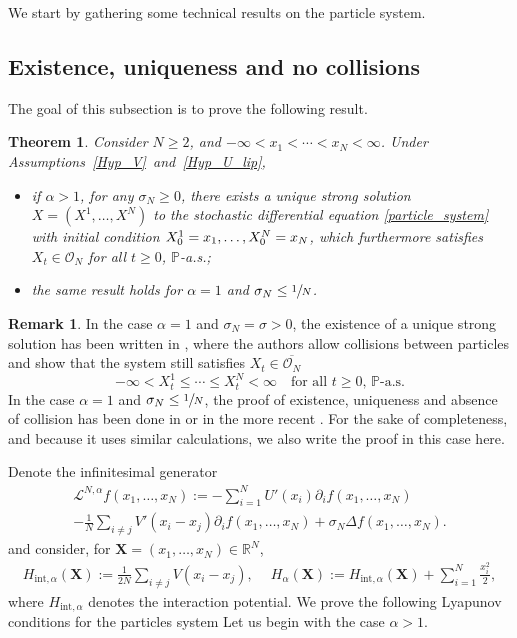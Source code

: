 \documentclass[10pt]{amsart}
\newcommand{\bX}{{\boldsymbol{X}}}
\newcommand{\rint}{\mathrm{int}}
\theoremstyle{plain}
\newtheorem{theorem}{Theorem}
\theoremstyle{definition}
\newtheorem{remark}{Remark}[section]
\begin{document}
We start by gathering some technical results on the particle system.

\subsection{Existence, uniqueness and no collisions}\label{sec_exist}

The goal of this subsection is to prove the following result.

\begin{theorem}\label{exist_unique}
Consider $N\geq 2$, and $-\infty<x_1<\cdots<x_N<\infty$. Under Assumptions~\ref{Hyp_V}~and~\ref{Hyp_U_lip},
\begin{itemize}
\item if $\alpha>1$, for any $\sigma_N\geq0$, there exists a unique strong solution $X=(X^1,\dots,X^N)$ to the stochastic differential equation \eqref{particle_system} with initial condition $X^1_0=x_1,\dots,\allowbreak X^N_0=\nobreak x_N$, which furthermore satisfies $X_t\in\mathcal{O}_N$ for all $t\geq0$, $\mathbb{P}$-a.s.;
\item the same result holds for $\alpha=1$ and $\sigma_N\leq\sfrac{1}{N}$.
\end{itemize}
\end{theorem}

\begin{remark}
In the case $\alpha=1$ and $\sigma_N=\sigma>0$, the existence of a unique strong solution has been written in \cite[Th.\,2.5]{cepa_lepingle}, where the authors allow collisions between particles and show that the system still satisfies $X_t\in\overline{\mathcal{O}_N}$ \ie
\[
-\infty<X^1_t\leq\cdots\leq X^N_t<\infty\quad\text{for all }t\geq0,\, \mathbb{P}\text{-a.s.}
\]
In the case $\alpha=1$ and $\sigma_N\leq\sfrac{1}{N}$, the proof of existence, uniqueness and absence of collision has been done in \cite{Rogers_Shi} or in the more recent \cite{Li_Li_Xie}. For the sake of completeness, and because it uses similar calculations, we also write the proof in this case here.
\end{remark}

Denote the infinitesimal generator
\begin{multline*}
\mathcal{L}^{N,\alpha}f(x_1,\dots,x_N):=-\sum_{i=1}^NU'(x_i)\partial_if(x_1,\dots,x_N)\\[-3pt]
-\frac{1}{N}\sum_{i\neq j}V'(x_i-x_j)\partial_if(x_1,\dots,x_N)+\sigma_N\Delta f(x_1,\dots,x_N).
\end{multline*}
and consider, for $\bX=(x_1,\dots,x_N)\in\mathbb{R}^N$,
\begin{align*}
H_{\rint, \alpha}(\bX):=\frac{1}{2N}\sum_{i\neq j}V(x_i-x_j),\quad \ H_{\alpha}(\bX):=H_{\rint, \alpha}(\bX)+\sum_{i=1}^N \frac{x^2_i}{2},
\end{align*}
where $H_{\rint,\alpha}$ denotes the interaction potential. We prove the following Lyapunov conditions for the particles system Let us begin with the case $\alpha>1$.
\end{document}
